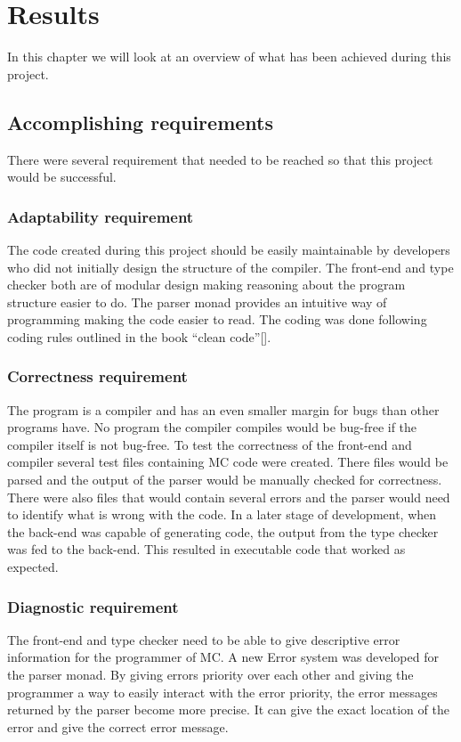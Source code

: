 \section{Results}

In this chapter we will look at an overview of what has been achieved during this project.

\subsection{Accomplishing requirements}

There were several requirement that needed to be reached so that this project would be successful.

\subsubsection{Adaptability requirement}
The code created during this project should be easily maintainable by developers who did not initially design the structure of the compiler.
\linebreak
The front-end and type checker both are of modular design making reasoning about the program structure easier to do. The parser monad provides an intuitive way of programming making the code easier to read. The coding was done following coding rules outlined in the book “clean code”[]. 

\subsubsection{Correctness requirement}
The program is a compiler and has an even smaller margin for bugs than other programs have. 
No program the compiler compiles would be bug-free if the compiler itself is not bug-free.
\linebreak
To test the correctness of the front-end and compiler several test files containing MC code were created. There files would be parsed and the output of the parser would be manually checked for correctness. There were also files that would contain several errors and the parser would need to identify what is wrong with the code.
In a later stage of development, when the back-end was capable of generating code, the output from the type checker was fed to the back-end. This resulted in executable code that worked as expected. 

\subsubsection{Diagnostic requirement}
The front-end and type checker need to be able to give descriptive error information for the programmer of MC.
\linebreak
A new Error system was developed for the parser monad. By giving errors priority over each other and giving the programmer a way to easily interact with the error priority, the error messages returned by the parser become more precise. It can give the exact location of the error and give the correct error message. 


